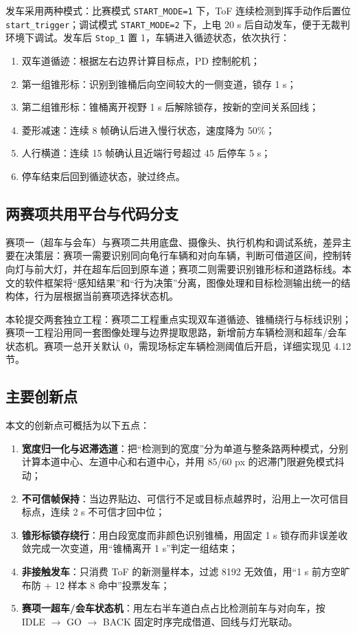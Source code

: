 \documentclass{MaiTechReport}
\begin{document}
发车采用两种模式：比赛模式 \texttt{START\_MODE=1} 下，ToF 连续检测到挥手动作后置位 \texttt{start\_trigger}；调试模式 \texttt{START\_MODE=2} 下，上电 20 s 后自动发车，便于无裁判环境下调试。发车后 \texttt{Stop\_1} 置 1，车辆进入循迹状态，依次执行：

\begin{enumerate}
  \item 双车道循迹：根据左右边界计算目标点，PD 控制舵机；
  \item 第一组锥形标：识别到锥桶后向空间较大的一侧变道，锁存 1 s；
  \item 第二组锥形标：锥桶离开视野 1 s 后解除锁存，按新的空间关系回线；
  \item 菱形减速：连续 8 帧确认后进入慢行状态，速度降为 50\%；
  \item 人行横道：连续 15 帧确认且近端行号超过 45 后停车 5 s；
  \item 停车结束后回到循迹状态，驶过终点。
\end{enumerate}

\subsection{两赛项共用平台与代码分支}
赛项一（超车与会车）与赛项二共用底盘、摄像头、执行机构和调试系统，差异主要在决策层：赛项一需要识别同向龟行车辆和对向车辆，判断可借道区间，控制转向灯与前大灯，并在超车后回到原车道；赛项二则需要识别锥形标和道路标线。本文的软件框架将“感知结果”和“行为决策”分离，图像处理和目标检测输出统一的结构体，行为层根据当前赛项选择状态机。

本轮提交两套独立工程：赛项二工程重点实现双车道循迹、锥桶绕行与标线识别；赛项一工程沿用同一套图像处理与边界提取思路，新增前方车辆检测和超车/会车状态机。赛项一总开关默认 0，需现场标定车辆检测阈值后开启，详细实现见 4.12 节。

\subsection{主要创新点}
本文的创新点可概括为以下五点：
\begin{enumerate}
  \item \textbf{宽度归一化与迟滞选道}：把“检测到的宽度”分为单道与整条路两种模式，分别计算本道中心、左道中心和右道中心，并用 85/60 px 的迟滞门限避免模式抖动；
  \item \textbf{不可信帧保持}：当边界贴边、可信行不足或目标点越界时，沿用上一次可信目标点，连续 2 s 不可信才回中位；
  \item \textbf{锥形标锁存绕行}：用白段宽度而非颜色识别锥桶，用固定 1 s 锁存而非误差收敛完成一次变道，用“锥桶离开 1 s”判定一组结束；
  \item \textbf{非接触发车}：只消费 ToF 的新测量样本，过滤 8192 无效值，用“1 s 前方空旷布防 + 12 样本 8 命中”投票发车；
  \item \textbf{赛项一超车/会车状态机}：用左右半车道白点占比检测前车与对向车，按 IDLE $\to$ GO $\to$ BACK 固定时序完成借道、回线与灯光联动。
\end{enumerate}
\end{document}
